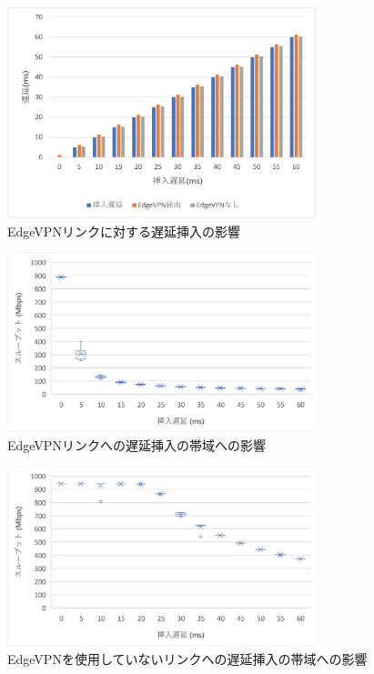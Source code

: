 \begin{figure}[t]
    \centering
    \includegraphics[width=0.8\textwidth,keepaspectratio,clip]{img/graph_ratency.pdf}
    \caption{EdgeVPNリンクに対する遅延挿入の影響}
    \label{fig:ratency}
\end{figure}

\begin{figure}[t]
    \centering
    \includegraphics[width=0.8\textwidth,keepaspectratio,clip]{img/bandwidth_withEdgeVPN.pdf}
    \caption{EdgeVPNリンクへの遅延挿入の帯域への影響}
    \label{fig:band_with_edge}
\end{figure}

\begin{figure}[t]
    \centering
    \includegraphics[width=0.8\textwidth,keepaspectratio,clip]{img/bandwidth_withoutEdgeVPN.pdf}
    \caption{EdgeVPNを使用していないリンクへの遅延挿入の帯域への影響}
    \label{fig:band_without_edge}
\end{figure}

